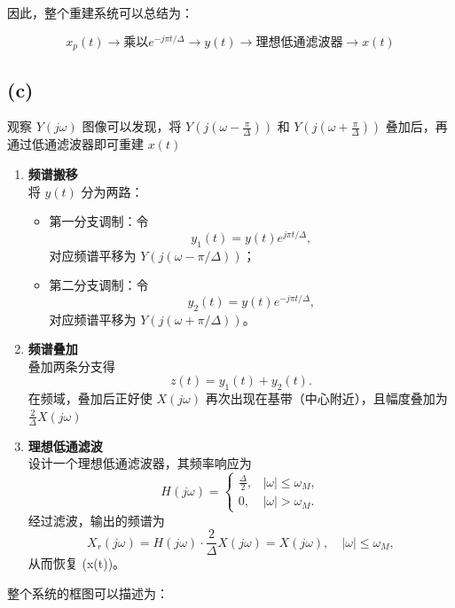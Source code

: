 \documentclass[11pt]{article}
\providecommand{\tightlist}{%
      \setlength{\itemsep}{0pt}\setlength{\parskip}{0pt}}
\begin{document}
因此，整个重建系统可以总结为：

\[
   x_p(t) → 乘以 e^{-j\pi t/\Delta} → y(t) → 理想低通滤波器 → x(t)
\]

    \subsection{(c)}\label{c}

观察 \(Y(j\omega)\) 图像可以发现，将
\(Y(j(\omega - \frac{\pi}{\Delta}))\) 和
\(Y(j(\omega + \frac{\pi}{\Delta}))\) 叠加后，再通过低通滤波器即可重建
\(x(t)\)

\begin{enumerate}
\def\labelenumi{\arabic{enumi}.}
\item
  \textbf{频谱搬移}\\
  将 \(y(t)\) 分为两路：

  \begin{itemize}
  \tightlist
  \item
    第一分支调制：令\\
    \[
    y_1(t)= y(t)e^{j\pi t/\Delta},
    \] 对应频谱平移为 \(Y(j(\omega-\pi/\Delta))\)；\\
  \item
    第二分支调制：令\\
    \[
    y_2(t)= y(t)e^{-j\pi t/\Delta},
    \] 对应频谱平移为 \(Y(j(\omega+\pi/\Delta))\)。
  \end{itemize}
\item
  \textbf{频谱叠加}\\
  叠加两条分支得\\
  \[
  z(t)=y_1(t)+y_2(t).
  \] 在频域，叠加后正好使 \(X(j\omega)\)
  再次出现在基带（中心附近），且幅度叠加为
  \(\frac{2}{\Delta}X(j\omega)\)
\item
  \textbf{理想低通滤波}\\
  设计一个理想低通滤波器，其频率响应为\\
  \[
  H(j\omega)=
  \begin{cases}
  \frac{\Delta}{2}, & |\omega| \le \omega_M, \\
  0, & |\omega| > \omega_M.
  \end{cases}
  \] 经过滤波，输出的频谱为\\
  \[
  X_r(j\omega)=H(j\omega)\cdot\frac{2}{\Delta}X(j\omega)=X(j\omega), \quad |\omega|\le\omega_M,
  \] 从而恢复 (x(t))。
\end{enumerate}

整个系统的框图可以描述为：
\end{document}
